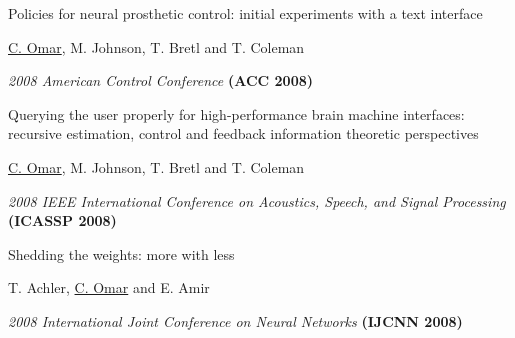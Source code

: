 \documentclass[10pt,letterpaper]{article}
\renewenvironment{itemize}{
  \begin{list}{}{
    \setlength{\leftmargin}{1.25em}
    \setlength{\itemsep}{0.25em}
    \setlength{\parskip}{0pt}
    \setlength{\parsep}{0.2em}
  }
}{
  \end{list}
}
\begin{document}
\begin{enumerate}[resume]
\begin{itemize}
  \end{itemize}
\item Policies for neural prosthetic control: initial experiments with a text interface
  \begin{itemize}
    \item \underline{C. Omar}, M. Johnson, T. Bretl and T. Coleman
    \item \textit{2008 American Control Conference} {\textbf{(ACC 2008)}}
  \end{itemize}
\item Querying the user properly for high-performance brain machine interfaces: recursive estimation, control and feedback information theoretic perspectives
  \begin{itemize}
    \item \underline{C. Omar}, M. Johnson, T. Bretl and T. Coleman
    \item \textit{2008 IEEE International Conference on Acoustics, Speech, and Signal Processing} {\textbf{(ICASSP 2008)}}
  \end{itemize}
\item Shedding the weights: more with less
  \begin{itemize}
    \item T. Achler, \underline{C. Omar} and E. Amir
    \item \textit{2008 International Joint Conference on Neural Networks} {\textbf{(IJCNN 2008)}}
  \end{itemize}
\end{enumerate}

\end{document}
